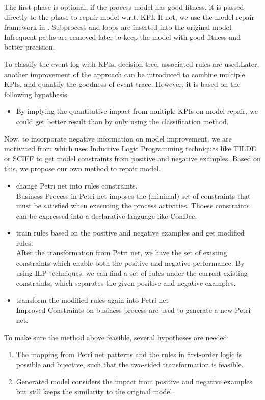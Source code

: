 \documentclass[12pt, a4paper]{article}
\begin{document}
The first phase is optional, if the process model has good fitness, it is passed directly to the phase to repair model w.r.t. KPI. If not, we use the model repair framework in \cite{Fahland}. Subprocess and loops are inserted into the original model. Infrequent paths are removed later to keep the model with good fitness and better precision. 

To classify the event log with KPIs, decision tree, associated rules are used.Later, another improvement of the approach can be introduced to combine multiple KPIs, and quantify the goodness of event trace. However, it is based on the following hypothesis. 
\begin{itemize}
	\item By implying the quantitative impact from multiple KPIs on model repair, we could get better result than by only using the classification method.  
\end{itemize} 

Now, to incorporate negative information on model improvement, we are motivated from \cite{pesic} \cite{Broucke} \cite{Lamma} \cite{chesani} which uses Inductive Logic Programming techniques like TILDE or SCIFF to get model constraints from positive and negative examples. Based on this, we propose our own method to repair model. 
\begin{itemize}
	\item change Petri net into rules constraints.\\
	Business Process in Petri net imposes  the (minimal) set
	of constraints that must be satisfied when executing the process activities. Thoese constraints can be expressed into a declarative language like ConDec. 
	\item train rules based on the positive and negative examples and get modified rules. \\ 
	After the transformation from Petri net, we have the set of existing constraints which enable both the positive and negative performance. By using ILP techniques, we can find a set of rules under the current existing constraints, which separates the given positive and negative examples.
	\item transform the modified rules again into Petri net\\
	Improved Constraints on business process are used to generate a new Petri net.
\end{itemize}
To make sure the method above feasible, several hypotheses are needed: 
\begin{enumerate}
	\item The mapping from Petri net patterns and the rules in first-order logic is possible and bijective, such that the two-sided transformation is feasible.
	\item Generated model considers the impact from positive and negative examples but still keeps the similarity to the original model. 
\end{enumerate}
\end{document}
